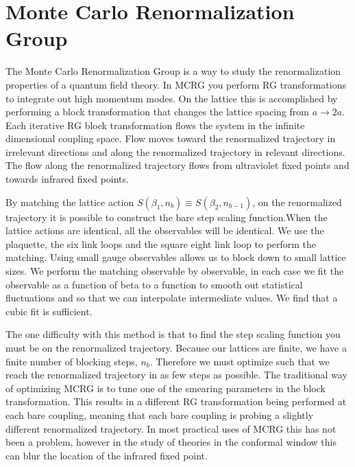 \documentclass{PoS}
\begin{document}
\section{Monte Carlo Renormalization Group}
\label{sec:mcrg}
The Monte Carlo Renormalization Group is a way to study the renormalization properties of a quantum field theory.
In MCRG you perform RG transformations to integrate out high momentum modes.
On the lattice this is accomplished by performing a block transformation that changes the lattice spacing from $a \to 2a$.
Each iterative RG block transformation flows the system in the infinite dimensional coupling space.
Flow moves toward the renormalized trajectory in irrelevant directions and along the renormalized trajectory in relevant directions.
The flow along the renormalized trajectory flows from ultraviolet fixed points and towards infrared fixed points.

By matching the lattice action $S(\beta_1, n_b) \equiv S(\beta_2, n_{b - 1})$, on the renormalized trajectory it is possible to construct the bare step scaling function.When the lattice actions are identical, all the observables will be identical.
We use the plaquette, the six link loops and the square eight link loop to perform the matching.
Using small gauge observables allows us to block down to small lattice sizes.
We perform the matching observable by observable, in each case we fit the observable as a function of beta to a function to smooth out statistical fluctuations and so that we can interpolate intermediate values.
We find that a cubic fit is sufficient.

The one difficulty with this method is that to find the step scaling function you must be on the renormalized trajectory.
Because our lattices are finite, we have a finite number of blocking steps, $n_b$.
Therefore we must optimize such that we reach the renormalized trajectory in as few steps as possible.
The traditional way of optimizing MCRG is to tune one of the smearing parameters in the block transformation.
This results in a different RG transformation being performed at each bare coupling, meaning that each bare coupling is probing a slightly different renormalized trajectory.
In most practical uses of MCRG this has not been a problem, however in the study of theories in the conformal window this can blur the location of the infrared fixed point.
\end{document}
